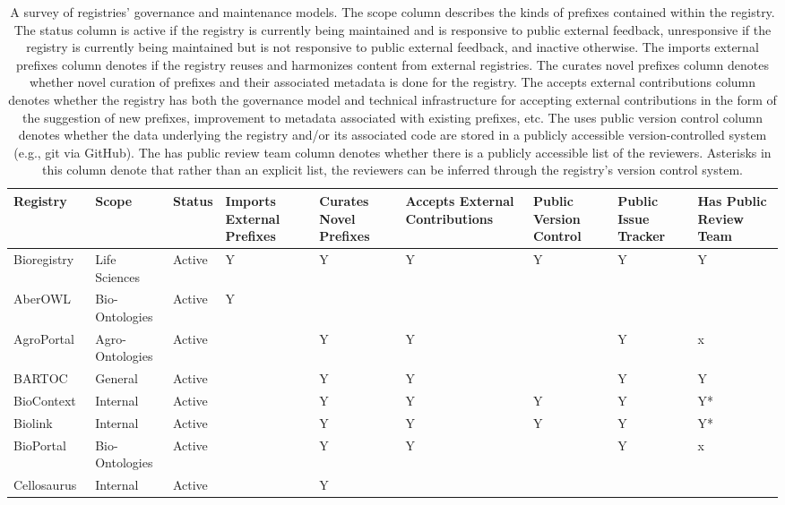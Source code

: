 \begin{table}
\caption{A survey of registries' governance and maintenance models. The scope column describes the kinds of prefixes contained within the registry. The status column is active if the registry is currently being maintained and is responsive to public external feedback, unresponsive if the registry is currently being maintained but is not responsive to public external feedback, and inactive otherwise. The imports external prefixes column denotes if the registry reuses and harmonizes content from external registries. The curates novel prefixes column denotes whether novel curation of prefixes and their associated metadata is done for the registry. The accepts external contributions column denotes whether the registry has both the governance model and technical infrastructure for accepting external contributions in the form of the suggestion of new prefixes, improvement to metadata associated with existing prefixes, etc. The uses public version control column denotes whether the data underlying the registry and/or its associated code are stored in a publicly accessible version-controlled system (e.g., git via GitHub). The has public review team column denotes whether there is a publicly accessible list of the reviewers. Asterisks in this column denote that rather than an explicit list, the reviewers can be inferred through the registry's version control system.}
\label{tab:registry-comparison-governance}
\begin{tabular}{lllllllll}
\toprule
Registry & Scope & Status & Imports External Prefixes & Curates Novel Prefixes & Accepts External Contributions & Public Version Control & Public Issue Tracker & Has Public Review Team \\
\midrule
Bioregistry~\cite{Hoyt2022} & Life Sciences & Active & Y & Y & Y & Y & Y & Y \\
AberOWL~\cite{Hoehndorf2015} & Bio-Ontologies & Active & Y &  &  &  &  &  \\
AgroPortal~\cite{Jonquet2018} & Agro-Ontologies & Active &  & Y & Y &  & Y & x \\
BARTOC & General & Active &  & Y & Y &  & Y & Y \\
BioContext~\cite{biocontext} & Internal & Active &  & Y & Y & Y & Y & Y* \\
Biolink~\cite{Unni2022} & Internal & Active &  & Y & Y & Y & Y & Y* \\
BioPortal~\cite{Whetzel2011} & Bio-Ontologies & Active &  & Y & Y &  & Y & x \\
Cellosaurus~\cite{Bairoch2018} & Internal & Active &  & Y &  &  &  &  \\

\end{tabular}
\end{table}
